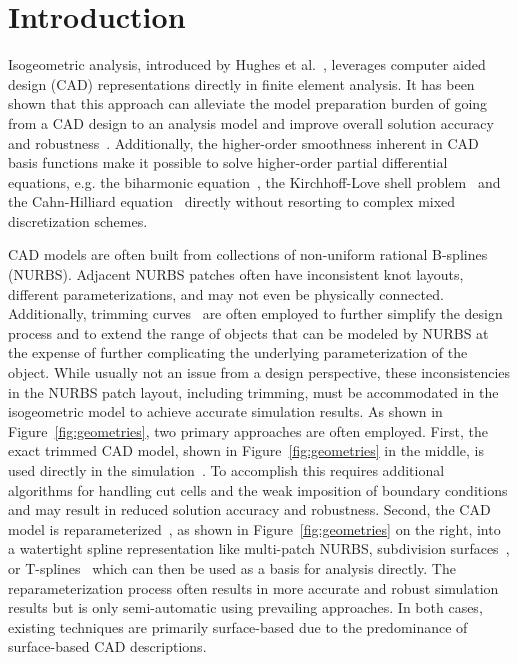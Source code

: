 \chapter{Introduction}
\label{chp:chapter1}
\graphicspath{{figures/}{figures/chapter1/}}

Isogeometric analysis, introduced by Hughes et al.~\cite{HUGHES20054135}, leverages computer aided design (CAD) representations directly in finite element analysis. It has been shown that this approach can alleviate the model preparation burden of going from a CAD design to an analysis model and improve overall solution accuracy and robustness~\cite{bazilevs2006isogeometric, da2011some, da2014mathematical}. Additionally, the higher-order smoothness inherent in CAD basis functions make it possible to solve higher-order partial differential equations, e.g. the biharmonic equation~\cite{kapl_isogeometric_2015, kapl_isogeometric_2017}, the Kirchhoff-Love shell problem~\cite{kiendl2009isogeometric, kiendl2010bending, kiendl2015isogeometric} and the Cahn-Hilliard equation~\cite{gomez2008isogeometric, borden2014higher} directly without resorting to complex mixed discretization schemes.\par

CAD models are often built from collections of non-uniform rational B-splines (NURBS). Adjacent NURBS patches often have inconsistent knot layouts, different parameterizations, and may not even be physically connected. Additionally, trimming curves~\cite{kim2009isogeometric, schmidt2012isogeometric} are often employed to further simplify the design process and to extend the range of objects that can be modeled by NURBS at the expense of further complicating the underlying parameterization of the object. While usually not an issue from a design perspective, these inconsistencies in the NURBS patch layout, including trimming, must be accommodated in the isogeometric model to achieve accurate simulation results. As shown in Figure~\ref{fig:geometries}, two primary approaches are often employed. First, the exact trimmed CAD model, shown in Figure~\ref{fig:geometries} in the middle, is used directly in the simulation~\cite{schmidt2012isogeometric}. To accomplish this requires additional algorithms for handling cut cells and the weak imposition of boundary conditions and may result in reduced solution accuracy and robustness. Second, the CAD model is reparameterized~\cite{xu2014high}, as shown in Figure~\ref{fig:geometries} on the right, into a watertight spline representation like multi-patch NURBS, subdivision surfaces~\cite{peters2008subdivision}, or T-splines~\cite{sederberg_t-splines_2003} which can then be used as a basis for analysis directly. The reparameterization process often results in more accurate and robust simulation results but is only semi-automatic using prevailing approaches. In both cases, existing techniques are primarily surface-based due to the predominance of surface-based CAD descriptions.

